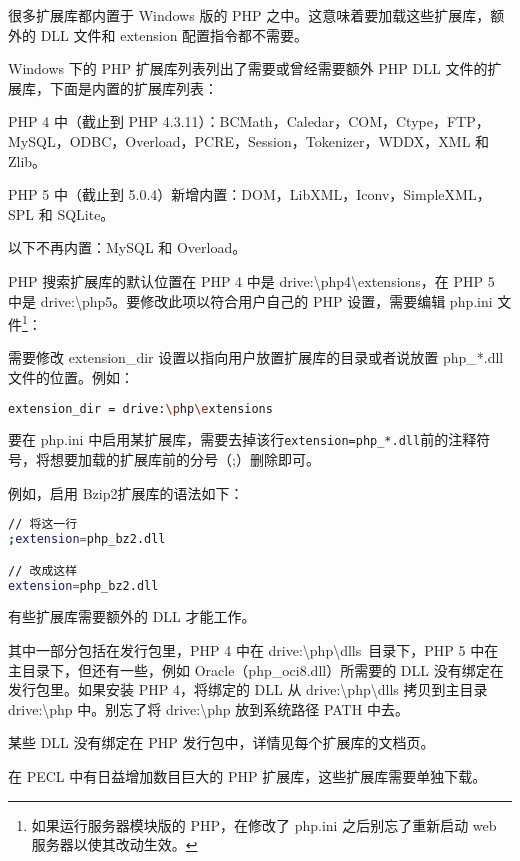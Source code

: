 很多扩展库都内置于 Windows 版的 PHP 之中。这意味着要加载这些扩展库，额外的 DLL 文件和 extension 配置指令都不需要。

Windows 下的 PHP 扩展库列表列出了需要或曾经需要额外 PHP DLL 文件的扩展库，下面是内置的扩展库列表：

\begin{compactitem}
\item PHP 4 中（截止到 PHP 4.3.11）：BCMath，Caledar，COM，Ctype，FTP，MySQL，ODBC，Overload，PCRE，Session，Tokenizer，WDDX，XML 和 Zlib。
\item PHP 5 中（截止到 5.0.4）新增内置：DOM，LibXML，Iconv，SimpleXML，SPL 和 SQLite。
\item 以下不再内置：MySQL 和 Overload。
\end{compactitem}

PHP 搜索扩展库的默认位置在 PHP 4 中是 drive:{\textbackslash}php4{\textbackslash}extensions，在 PHP 5 中是 drive:{\textbackslash}php5。要修改此项以符合用户自己的 PHP 设置，需要编辑 php.ini 文件\footnote{如果运行服务器模块版的 PHP，在修改了 php.ini 之后别忘了重新启动 web 服务器以使其改动生效。}：


\begin{compactitem}
\item 需要修改 extension\_dir 设置以指向用户放置扩展库的目录或者说放置 php\_*.dll 文件的位置。例如：

\begin{lstlisting}[language=bash]
extension_dir = drive:\php\extensions
\end{lstlisting}

\item 要在 php.ini 中启用某扩展库，需要去掉该行\texttt{extension=php\_*.dll}前的注释符号，将想要加载的扩展库前的分号（;）删除即可。

例如，启用 Bzip2扩展库的语法如下：

\begin{lstlisting}[language=bash]
// 将这一行
;extension=php_bz2.dll

// 改成这样
extension=php_bz2.dll
\end{lstlisting}



\item 有些扩展库需要额外的 DLL 才能工作。

其中一部分包括在发行包里，PHP 4 中在 drive:{\textbackslash}php{\textbackslash}dlls\ 目录下，PHP 5 中在主目录下，但还有一些，例如 Oracle（php\_oci8.dll）所需要的 DLL 没有绑定在发行包里。如果安装 PHP 4，将绑定的 DLL 从 drive:{\textbackslash}php{\textbackslash}dlls 拷贝到主目录 drive:{\textbackslash}php 中。别忘了将 drive:{\textbackslash}php 放到系统路径 PATH 中去。

\item 某些 DLL 没有绑定在 PHP 发行包中，详情见每个扩展库的文档页。

在 PECL 中有日益增加数目巨大的 PHP 扩展库，这些扩展库需要单独下载。

\end{compactitem}

